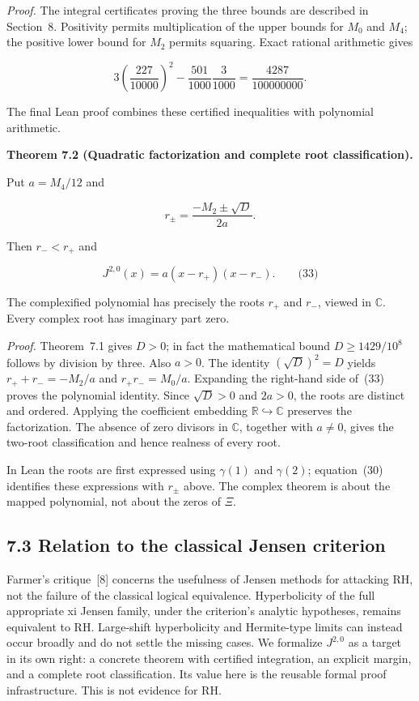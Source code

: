 \documentclass[
  11pt,
]{article}
\begin{document}
\emph{Proof.} The integral certificates proving the three bounds are described in Section~8. Positivity permits multiplication of the upper bounds for \(M_{0}\) and \(M_{4}\); the positive lower bound for \(M_{2}\) permits squaring. Exact rational arithmetic gives

\[3\left( \frac{227}{10000} \right)^{2} - \frac{501}{1000}\frac{3}{1000} = \frac{4287}{100000000}.\]

The final Lean proof combines these certified inequalities with polynomial arithmetic.

\textbf{Theorem 7.2 (Quadratic factorization and complete root classification).}

Put \(a = M_{4}/12\) and

\[r_{\pm} = \frac{- M_{2} \pm \sqrt{D}}{2a}.\]

Then \(r_{-} < r_{+}\) and

\[J^{2,0}(x) = a\left( x - r_{+} \right)\left( x - r_{-} \right).\quad\quad\text{(33)}\]

The complexified polynomial has precisely the roots \(r_{+}\) and \(r_{-}\), viewed in \(\mathbb{C}\). Every complex root has imaginary part zero.

\emph{Proof.} Theorem~7.1 gives \(D > 0\); in fact the mathematical bound \(D \geq 1429/10^{8}\) follows by division by three. Also \(a > 0\). The identity \(\left( \sqrt{D} \right)^{2} = D\) yields \(r_{+} + r_{-} = - M_{2}/a\) and \(r_{+}r_{-} = M_{0}/a\). Expanding the right-hand side of~(33) proves the polynomial identity. Since \(\sqrt{D} > 0\) and \(2a > 0\), the roots are distinct and ordered. Applying the coefficient embedding \(\mathbb{R} \hookrightarrow \mathbb{C}\) preserves the factorization. The absence of zero divisors in \(\mathbb{C}\), together with \(a \neq 0\), gives the two-root classification and hence realness of every root.

In Lean the roots are first expressed using \(\gamma(1)\) and \(\gamma(2)\); equation~(30) identifies these expressions with \(r_{\pm}\) above. The complex theorem is about the mapped polynomial, not about the zeros of \(\Xi\).

\hypertarget{relation-to-the-classical-jensen-criterion}{%
\subsection{7.3 Relation to the classical Jensen criterion}\label{relation-to-the-classical-jensen-criterion}}

Farmer's critique~{[}8{]} concerns the usefulness of Jensen methods for attacking RH, not the failure of the classical logical equivalence. Hyperbolicity of the full appropriate xi Jensen family, under the criterion's analytic hypotheses, remains equivalent to RH. Large-shift hyperbolicity and Hermite-type limits can instead occur broadly and do not settle the missing cases. We formalize \(J^{2,0}\) as a target in its own right: a concrete theorem with certified integration, an explicit margin, and a complete root classification. Its value here is the reusable formal proof infrastructure. This is not evidence for RH.
\end{document}
